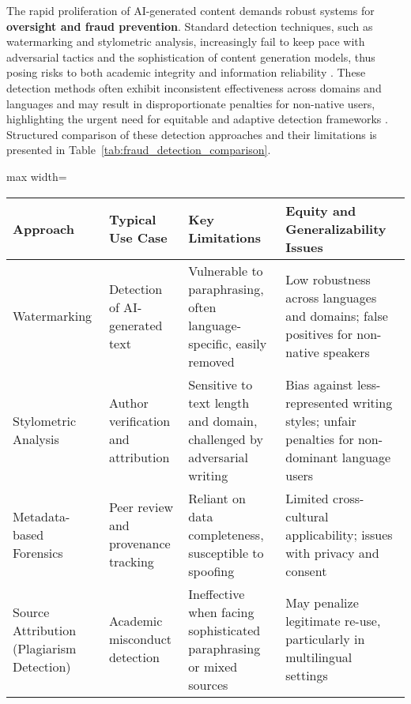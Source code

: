 The rapid proliferation of AI-generated content demands robust systems for \textbf{oversight and fraud prevention}. Standard detection techniques, such as watermarking and stylometric analysis, increasingly fail to keep pace with adversarial tactics and the sophistication of content generation models, thus posing risks to both academic integrity and information reliability \cite{ref76,ref80,ref85,ref104,ref114,ref115,ref117}. These detection methods often exhibit inconsistent effectiveness across domains and languages and may result in disproportionate penalties for non-native users, highlighting the urgent need for equitable and adaptive detection frameworks \cite{ref90,ref92,ref97,ref104,ref112,ref113,ref114}. Structured comparison of these detection approaches and their limitations is presented in Table~\ref{tab:fraud_detection_comparison}.

\begin{table*}[htbp]
\centering
\caption{Comparative Overview of Automated Fraud Detection Approaches in Academic Workflows}
\label{tab:fraud_detection_comparison}
\begin{adjustbox}{max width=\textwidth}
\begin{tabular}{@{}llll@{}}
\toprule
\textbf{Approach}           & \textbf{Typical Use Case}                  & \textbf{Key Limitations}                                         & \textbf{Equity and Generalizability Issues} \\
\midrule
Watermarking                & Detection of AI-generated text & Vulnerable to paraphrasing, often language-specific, easily removed & Low robustness across languages and domains; false positives for non-native speakers \\
Stylometric Analysis        & Author verification and attribution        & Sensitive to text length and domain, challenged by adversarial writing & Bias against less-represented writing styles; unfair penalties for non-dominant language users \\
Metadata-based Forensics    & Peer review and provenance tracking         & Reliant on data completeness, susceptible to spoofing               & Limited cross-cultural applicability; issues with privacy and consent \\
Source Attribution (Plagiarism Detection) & Academic misconduct detection                & Ineffective when facing sophisticated paraphrasing or mixed sources & May penalize legitimate re-use, particularly in multilingual settings \\
\bottomrule
\end{tabular}
\end{adjustbox}
\end{table*}

